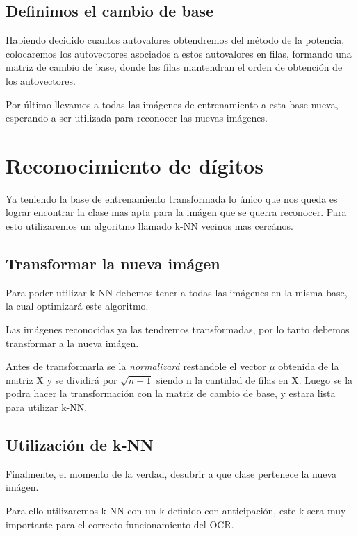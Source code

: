 \subsection{Definimos el cambio de base}

Habiendo decidido cuantos autovalores obtendremos del método de la potencia, colocaremos los autovectores asociados a estos autovalores en filas, formando una matriz de cambio de base, donde las filas mantendran el orden de obtención de los autovectores.

Por último llevamos a todas las imágenes de entrenamiento a esta base nueva, esperando a ser utilizada para reconocer las nuevas imágenes.


\section{Reconocimiento de dígitos}

Ya teniendo la base de entrenamiento transformada lo único que nos queda es lograr encontrar la clase mas apta para la imágen que se querra reconocer. Para esto utilizaremos un algoritmo llamado k-NN vecinos mas cercános.

\subsection{Transformar la nueva imágen}

Para poder utilizar k-NN debemos tener a todas las imágenes en la misma base, la cual optimizará este algoritmo.

Las imágenes reconocidas ya las tendremos transformadas, por lo tanto debemos transformar a la nueva imágen.

Antes de transformarla se la \textit{normalizará} restandole el vector $\mu$ obtenida de la matriz X y se dividirá por $\sqrt{n - 1}$ siendo n la cantidad de filas en X. Luego se la podra hacer la transformación con la matriz de cambio de base, y estara lista para utilizar k-NN.

\subsection{Utilización de k-NN}

Finalmente, el momento de la verdad, desubrir a que clase pertenece la nueva imágen.

Para ello utilizaremos k-NN con un k definido con anticipación, este k sera muy importante para el correcto funcionamiento del OCR.

